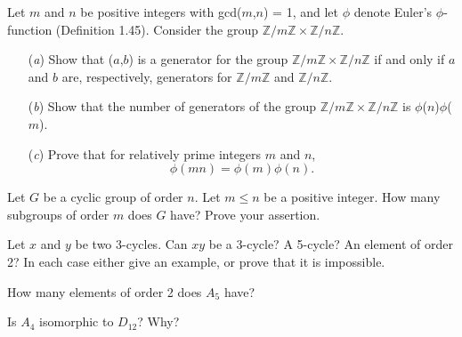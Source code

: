 \documentclass[12pt,letterpaper,boxed]{hmcpset}
\begin{document}

\begin{problem}[2.5.10]
Let $m$ and $n$ be positive integers with gcd($m$,$n$) = 1, and let $\phi$ denote Euler's $\phi$-function (Definition 1.45). Consider the group $\mathbb{Z}/m\mathbb{Z} \times \mathbb{Z}/n\mathbb{Z}$.
\begin{itemize}
  \item[(\textit{a})] Show that ($a$,$b$) is a generator for the group $\mathbb{Z}/m\mathbb{Z} \times \mathbb{Z}/n\mathbb{Z}$ if and only if $a$ and $b$ are, respectively, generators for $\mathbb{Z}/m\mathbb{Z} $ and $ \mathbb{Z}/n\mathbb{Z}$. 
  
  \item[(\textit{b})] Show that the number of generators of the group $\mathbb{Z}/m\mathbb{Z} \times \mathbb{Z}/n\mathbb{Z}$ is $\phi$($n$)$\phi$($m$).
  
  \item[(\textit{c})] Prove that for relatively prime integers $m$ and $n$, $$\phi(mn) = \phi(m)\phi(n).$$
\end{itemize}
\end{problem}

\begin{solution}

\end{solution}

\clearpage

\begin{problem}[2.6.22]
Let $G$ be a cyclic group of order $n$. Let $m \leq n$ be a positive integer. How many subgroups of order $m$ does $G$ have? Prove your assertion.
\end{problem}

\begin{solution}
\end{solution}

\clearpage

\begin{problem}[3.1.6]
Let $x$ and $y$ be two 3-cycles. Can $xy$ be a 3-cycle? A 5-cycle? An element of order 2? In each case either give an example, or prove that it is impossible. 
\end{problem}

\begin{solution}
\end{solution}

\clearpage


\begin{problem}[3.2.4]
How many elements of order 2 does $A_5$ have?
\end{problem}

\begin{solution}
\end{solution}

\clearpage

\begin{problem}[3.2.7]
Is $A_4$ isomorphic to $D_{12}$? Why?
\end{problem}

\begin{solution}

\end{solution}
\end{document}
